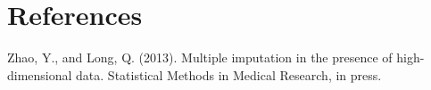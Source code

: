 \documentclass[a4paper]{article}
\begin{document}

\section{References}

Zhao, Y., and Long, Q. (2013). Multiple imputation in the presence of high-dimensional data. Statistical Methods in Medical Research, in press.
\end{document}
